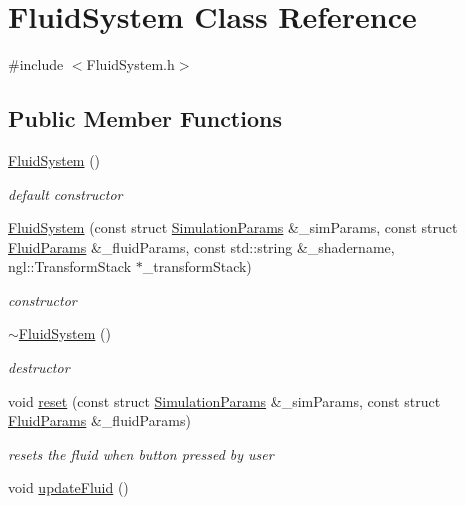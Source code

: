 \hypertarget{classFluidSystem}{
\section{FluidSystem Class Reference}
\label{classFluidSystem}
}


{\ttfamily \#include $<$FluidSystem.h$>$}\subsection*{Public Member Functions}
\begin{DoxyCompactItemize}
\item 
\hyperlink{classFluidSystem_a026c527ec418ae285285ffb2b877d1dc}{FluidSystem} ()
\begin{DoxyCompactList}\small\item\em default constructor \item\end{DoxyCompactList}\item 
\hyperlink{classFluidSystem_aad830c205f0647117beebc80f8c14969}{FluidSystem} (const struct \hyperlink{structSimulationParams}{SimulationParams} \&\_\-simParams, const struct \hyperlink{structFluidParams}{FluidParams} \&\_\-fluidParams, const std::string \&\_\-shadername, ngl::TransformStack $\ast$\_\-transformStack)
\begin{DoxyCompactList}\small\item\em constructor \item\end{DoxyCompactList}\item 
\hyperlink{classFluidSystem_a568108df17c8fe0ec5fce2ad225ae0cc}{$\sim$FluidSystem} ()
\begin{DoxyCompactList}\small\item\em destructor \item\end{DoxyCompactList}\item 
void \hyperlink{classFluidSystem_afbae2beaf10484816f73ca0d0c9fb754}{reset} (const struct \hyperlink{structSimulationParams}{SimulationParams} \&\_\-simParams, const struct \hyperlink{structFluidParams}{FluidParams} \&\_\-fluidParams)
\begin{DoxyCompactList}\small\item\em resets the fluid when button pressed by user \item\end{DoxyCompactList}\item 
void \hyperlink{classFluidSystem_a4f66756bd2842641f935acb32f14b137}{updateFluid} ()

\end{DoxyCompactItemize}
